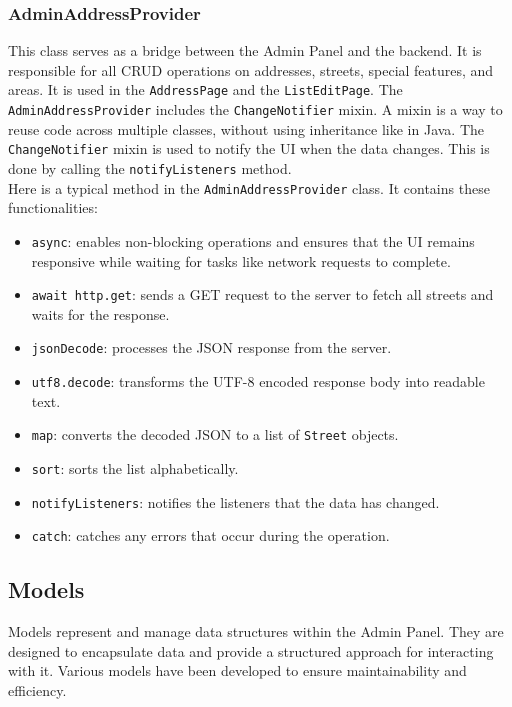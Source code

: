 \newpage
  \subsubsection{AdminAddressProvider}
This class serves as a bridge between the Admin Panel and the backend. It is responsible for all CRUD operations on addresses, streets, special features, and areas. It is used in the \texttt{AddressPage} and the \texttt{ListEditPage}. The \texttt{AdminAddressProvider} includes the \texttt{ChangeNotifier} mixin. A mixin is a way to reuse code across multiple classes, without using inheritance like in Java.\autocite{dart.dev} The \texttt{ChangeNotifier} mixin is used to notify the UI when the data changes. \autocite{flutter.dev} This is done by calling the \texttt{notifyListeners} method.\\
Here is a typical method in the \texttt{AdminAddressProvider} class. It contains these functionalities:

\begin{itemize}
    \item \texttt{async}: enables non-blocking operations and ensures that the UI remains responsive while waiting for tasks like network requests to complete.
    \item \texttt{await http.get}: sends a GET request to the server to fetch all streets and waits for the response.
    \item \texttt{jsonDecode}: processes the JSON response from the server.
    \item \texttt{utf8.decode}: transforms the UTF-8 encoded response body into readable text.
    \item \texttt{map}: converts the decoded JSON to a list of \texttt{Street} objects.
    \item \texttt{sort}: sorts the list alphabetically.
    \item \texttt{notifyListeners}: notifies the listeners that the data has changed.
    \item \texttt{catch}: catches any errors that occur during the operation.
\end{itemize}

\subsection{Models}
Models represent and manage data structures within the Admin Panel. They are designed to encapsulate data and provide a structured approach for interacting with it. Various models have been developed to ensure maintainability and efficiency.



